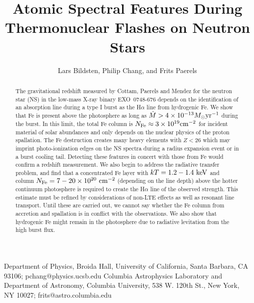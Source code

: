 \documentclass[iop,apjl,letterpaper]{emulateapj}
\begin{document}
\title{Atomic Spectral Features During Thermonuclear Flashes on 
Neutron Stars}

\author{Lars Bildsten, Philip Chang,
and Frits Paerels}
{Department of Physics, Broida Hall, University of California,
Santa Barbara, CA 93106; pchang@physics.ucsb.edu}
{Columbia Astrophysics Laboratory and Department of Astronomy,
Columbia University, 538 W. 120th St., New York, NY 10027;
frits@astro.columbia.edu}


\begin{abstract}

The gravitational redshift measured by Cottam, Paerels and Mendez for
the neutron star (NS) in the low-mass X-ray binary EXO~0748-676
depends on the identification of an absorption line during a type I
burst as the H$\alpha$ line from hydrogenic Fe. We show that Fe is
present above the photosphere as long as $\dot M>4\times
10^{-13}M_\odot {\rm yr^{-1}}$ during the burst. In this limit, the
total Fe column is $N_{\rm Fe}\approx 3\times 10^{19}{\rm cm^{-2}}$
for incident material of solar abundances and only depends on the
nuclear physics of the proton spallation. The Fe destruction creates
many heavy elements with $Z<26$ which may imprint photo-ionization
edges on the NS spectra during a radius expansion event or in a burst
cooling tail. Detecting these features in concert with those from Fe
would confirm a redshift measurement. We also begin to address the
radiative transfer problem, and find that a concentrated Fe layer with
$kT=1.2-1.4\ {\rm keV}$ and column $N_{\rm Fe}= 7-20 \times 10^{20}\
{\rm cm}^{-2}$ (depending on the line depth) above the hotter
continuum photosphere is required to create the H$\alpha$ line of the
observed strength. This estimate must be refined by considerations of
non-LTE effects as well as resonant line transport. Until these are
carried out, we cannot say whether the Fe column from accretion and
spallation is in conflict with the observations.  We also show that
hydrogenic Fe might remain in the photosphere due to radiative
levitation from the high burst flux.

\end{abstract}
\end{document}
